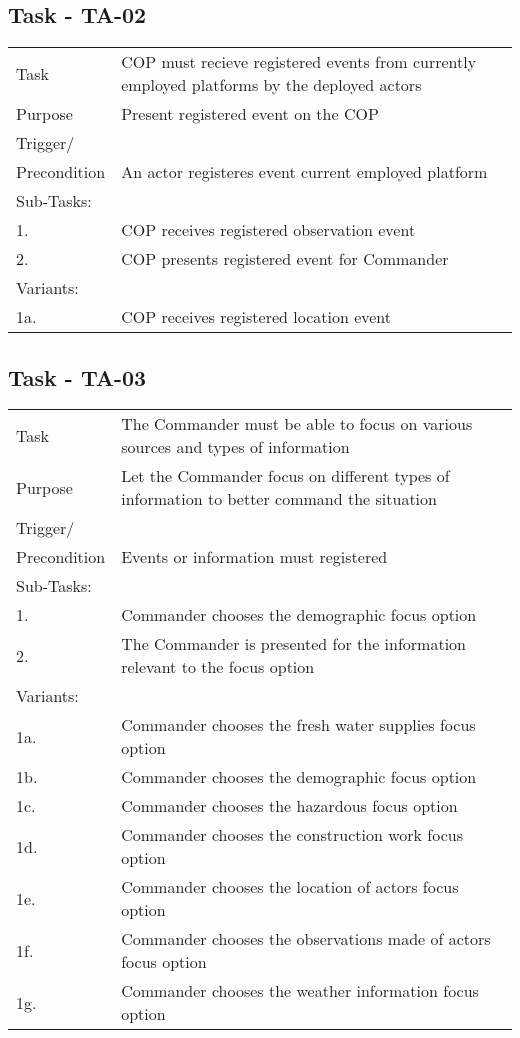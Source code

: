 \subsection{Task - TA-02}

\begin{longtable}{| p{2.5cm}  | p{10cm} |  }
	\hline
	Task & COP must recieve registered events from currently employed platforms by the deployed actors  \\
	Purpose & Present registered event on the COP \\
	Trigger/ &  \\ Precondition & An actor registeres event current employed platform \\
	\hline
	Sub-Tasks: & \\
	1. & COP receives registered observation event \\
	2. & COP presents registered event for Commander \\
	\hline
	Variants: & \\
	1a. & COP receives registered location event \\
	\hline
\end{longtable}

\subsection{Task - TA-03}
\begin{longtable}{| p{2.5cm}  | p{10cm} |  }
	\hline
	Task & The Commander must be able to focus on various sources and types of information  \\
	Purpose & Let the Commander focus on different types of information to better command the situation \\
	Trigger/ &  \\ Precondition & Events or information must registered \\
	\hline
	Sub-Tasks: & \\
	1. & Commander chooses the demographic focus option \\
	2. & The Commander is presented for the information relevant to the focus option \\
	\hline
	Variants: & \\
	1a. & Commander chooses the fresh water supplies focus option  \\
	1b. & Commander chooses the demographic focus option  \\
	1c. & Commander chooses the hazardous focus option  \\
	1d. & Commander chooses the construction work focus option  \\
	1e. & Commander chooses the location of actors focus option  \\
	1f. & Commander chooses the observations made of actors focus option \\
	1g. & Commander chooses the weather information focus option  \\
	\hline
\end{longtable}

